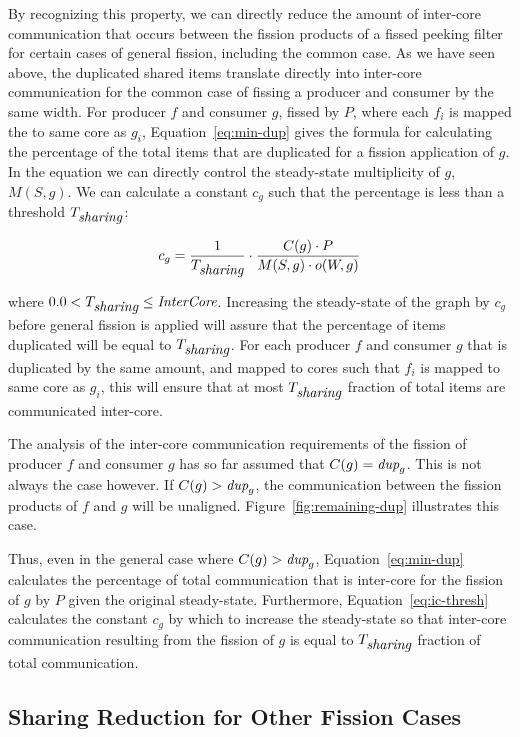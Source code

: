 By recognizing this property, we can directly reduce the amount of
inter-core communication that occurs between the fission products of a
fissed peeking filter for certain cases of general fission, including
the common case.  As we have seen above, the duplicated shared items
translate directly into inter-core communication for the common case
of fissing a producer and consumer by the same width.  For producer
$f$ and consumer $g$, fissed by $P$, where each $f_i$ is mapped the to
same core as $g_i$, Equation~\ref{eq:min-dup} gives the formula for
calculating the percentage of the total items that are duplicated for
a fission application of $g$.  In the equation we can directly control
the steady-state multiplicity of $g$, $M(S,g)$.  We can calculate a
constant $c_g$ such that the percentage is less than a threshold
$T_{\mbox{\it sharing}}$:

\begin{equation}
\label{eq:ic-thresh}
c_g = \frac{1}{T_{\mt{sharing}}} \cdot \frac{C(g) \cdot P}{M(S,g) \cdot o(W,g)}
\end{equation}

\noindent where $0.0 < T_{\mbox{\it sharing}} \le \mbox{\it InterCore}$. Increasing the
steady-state of the graph by $c_g$ before general fission is applied
will assure that the percentage of items duplicated will be equal to
$T_{\mbox{\it sharing}}$.  For each producer $f$ and consumer $g$ that is
duplicated by the same amount, and mapped to cores such that $f_i$ is
mapped to same core as $g_i$, this will ensure that at most
$T_{\mbox{\it sharing}}$ fraction of total items are communicated inter-core.



The analysis of the inter-core communication requirements of the
fission of producer $f$ and consumer $g$ has so far assumed that $C(g)
= \mbox{\it dup}_g $.  This is not always the case however.  If $C(g) >
\mbox{\it dup}_g$, the communication between the fission products of $f$ and
$g$ will be unaligned.  Figure~\ref{fig:remaining-dup} illustrates
this case.  

Thus, even in the general
case where $C(g) > \mbox{\it dup}_g$, Equation~\ref{eq:min-dup} calculates
the percentage of total communication that is inter-core for the
fission of $g$ by $P$ given the original steady-state. Furthermore,
Equation~\ref{eq:ic-thresh} calculates the constant $c_g$ by which to
increase the steady-state so that inter-core communication resulting
from the fission of $g$ is equal to $T_{\mbox{\it sharing}}$ fraction of
total communication.

\subsection{Sharing Reduction for Other Fission Cases}

